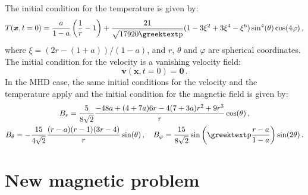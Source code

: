 The initial condition for the temperature is given by:
\begin{equation}
T(\bm{x},t=\num{0})=\frac{a}{1-a}\left(\frac{1}{r}-1\right)+\frac{21}{\sqrt{17920\gpi}}(1-3\xi^2+3\xi^4-\xi^6)\sin^4(\theta)\cos(4\varphi)\,,
\end{equation}
where $\xi=(2r-(1+a))/(1-a)$, and $r$, $\theta$ and $\varphi$ are spherical coordinates. The initial condition for the velocity is a vanishing velocity field:
\begin{equation}
\bm{v}(\bm{x},t=\num{0})=\bm{0}\,.
\end{equation}
In the MHD case, the same initial conditions for the velocity and the temperature apply and the initial condition for the magnetic field is given by:
\begin{equation}
\begin{gathered}
	B_r=\frac{5}{8\sqrt{2}}\frac{-48a+(4+7a)6r-4(7+3a)r^2+9r^3}{r}\cos(\theta)\,,\\
	B_\theta=-\frac{15}{4\sqrt{2}}\frac{(r-a)(r-1)(3r-4)}{r}\sin(\theta)\,,\quad
	B_\varphi=\frac{15}{8\sqrt{2}}\sin\left(\gpi\frac{r-a}{1-a}\right)\sin(2\theta)\,.
\end{gathered}
\end{equation}

\section{New magnetic problem}
